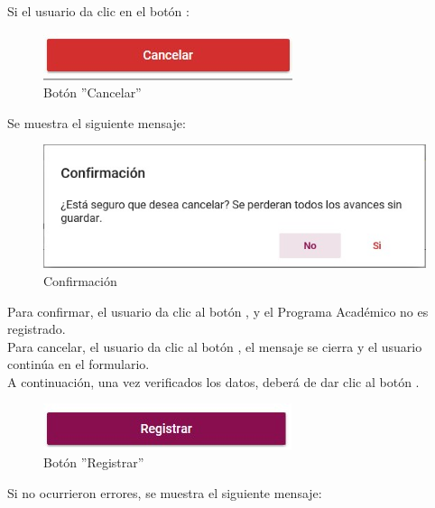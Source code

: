         Si el usuario da clic en el botón :

        \begin{figure}[H]
            \centering
            \hypertarget{cancel1}{\includegraphics[width=0.7\linewidth]{images/SP3/BtnCancelar}}
            \caption{Botón ''Cancelar''}
            \label{cancel1}
        \end{figure}

         Se muestra el siguiente mensaje:

        \begin{figure}[H]
            \centering
            \hypertarget{confirmar}{\includegraphics[width=0.7\linewidth]{images/SP3/Confirmacion}}
            \caption{Confirmación}
            \label{confirmar}
        \end{figure}

        Para confirmar, el usuario da clic al botón , y el Programa Académico no es registrado.\\

        Para cancelar, el usuario da clic al botón , el mensaje se cierra y el usuario continúa en el formulario.\\

        A continuación, una vez verificados los datos, deberá de dar clic al botón .
        \begin{figure}[H]
            \centering
            \hypertarget{btnreg}{\includegraphics[width=0.7\linewidth]{images/SP3/BtnRegistrar}}
            \caption{Botón ''Registrar''}
            \label{btnreg}
        \end{figure}

        Si no ocurrieron errores, se muestra el siguiente mensaje:

